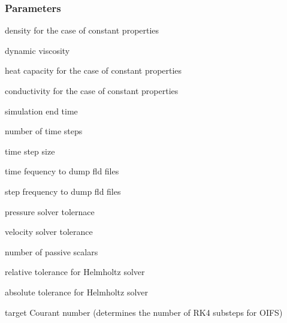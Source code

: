 \documentclass[letterpaper,10pt,english]{sphinxmanual}
\begin{document}
\subsubsection{Parameters}
\label{\detokenize{appendix:parameters}}


\begin{DUlineblock}{0em}
\item[]   density for the case of constant properties
\item[] 
\item[]   dynamic viscosity
\item[] 
\item[]   heat capacity for the case of constant properties
\item[] 
\item[]   conductivity for the case of constant properties
\item[] 
\item[]   simulation end time
\item[] 
\item[]   number of time steps
\item[] 
\item[]   time step size
\item[] 
\item[]   time fequency to dump fld files
\item[] 
\item[]   step frequency to dump fld files
\item[] 
\item[]   pressure solver tolernace
\item[] 
\item[]   velocity solver tolerance
\item[] 
\item[]   number of passive scalars
\item[] 
\item[]   relative tolerance for Helmholtz solver
\item[] 
\item[]   absolute tolerance for Helmholtz solver
\item[] 
\item[]   target Courant number (determines the number of RK4 substeps for OIFS)

\end{DUlineblock}
\end{document}

